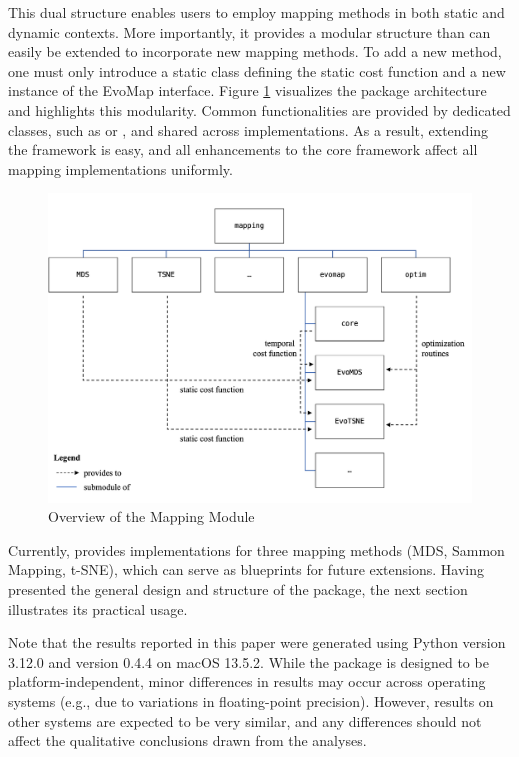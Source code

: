 \documentclass[article]{jss}
\begin{document}
This dual structure enables users to employ mapping methods in both static and dynamic contexts. More importantly, 
it provides a modular structure than can easily be extended to incorporate new mapping methods. To add a new method, 
one must only introduce a static class defining the static cost function and a new instance of the 
EvoMap  interface. Figure \ref{fig:package-design} visualizes the package architecture and highlights this 
modularity. Common functionalities are provided by dedicated classes, such as  or , and 
shared across implementations. As a result, extending the framework is easy, and all enhancements to the core 
framework affect all mapping implementations uniformly.

\begin{figure}[hbt!]
  \centering
  \includegraphics{../misc/package-design.png}
  \caption{\label{fig:package-design} Overview of the Mapping Module}
\end{figure}
  
Currently,  provides implementations for three mapping methods (MDS, Sammon
Mapping, t-SNE), which can serve as blueprints for future extensions. Having presented the
general design and structure of the package, the next section illustrates its practical usage. 

Note that the results reported in this paper were generated using Python version 3.12.0 and  
version 0.4.4 on macOS 13.5.2. While the  package is designed to be platform-independent, 
minor differences in results may occur across operating systems (e.g., due to variations in floating-point 
precision). However, results on other systems are expected to be very similar, and any differences should not 
affect the qualitative conclusions drawn from the analyses.
\end{document}

